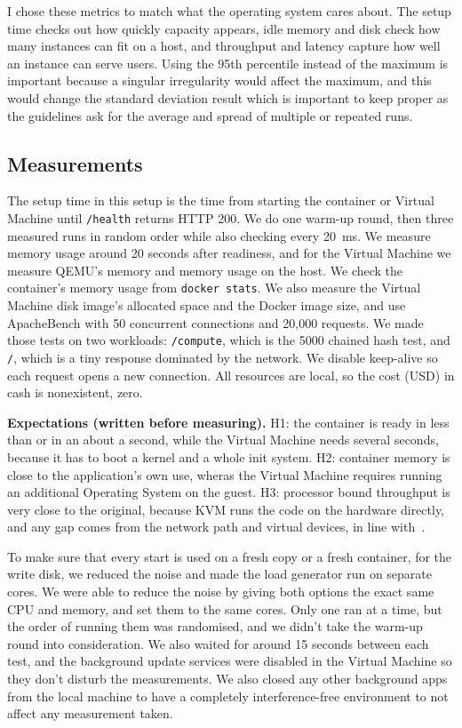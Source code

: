\documentclass[conference,a4paper]{IEEEtran}
\begin{document}
I chose these metrics to match what the operating system cares about. The setup time checks out how quickly capacity appears, idle memory and disk check how many instances can fit on a host, and throughput and latency capture how well an instance can serve users. Using the 95th percentile instead of the maximum is important because a singular irregularity would affect the maximum, and this would change the standard deviation result which is important to keep proper as the guidelines ask for the average and spread of multiple or repeated runs.

\subsection{Measurements}
The setup time in this setup is the time from starting the container or Virtual Machine until \texttt{/health} returns HTTP 200. We do one warm-up round, then three measured runs in random order while also checking every 20~ms. We measure memory usage around 20 seconds after readiness, and for the Virtual Machine we measure QEMU’s memory and memory usage on the host. We check the container’s memory usage from \texttt{docker stats}. We also measure the Virtual Machine disk image’s allocated space and the Docker image size, and use ApacheBench with 50 concurrent connections and 20,000 requests. We made those tests on two workloads: \texttt{/compute}, which is the 5000 chained hash test, and \texttt{/}, which is a tiny response dominated by the network. We disable keep-alive so each request opens a new connection. All resources are local, so the cost (USD) in cash is nonexistent, zero.

\textbf{Expectations (written before measuring).} H1: the container is ready in less than or in an about a second, while the Virtual Machine needs several seconds, because it has to boot a kernel and a whole init system. H2: container memory is close to the application's own use, wheras the Virtual Machine requires running an additional Operating System on the guest. H3: processor bound throughput is very close to the original, because KVM runs the code on the hardware directly, and any gap comes from the network path and virtual devices, in line with~\cite{b3}.

To make sure that every start is used on a fresh copy or a fresh container, for the write disk, we reduced the noise and made the load generator run on separate cores. We were able to reduce the noise by giving both options the exact same CPU and memory, and set them to the same cores. Only one ran at a time, but the order of running them was randomised, and we didn’t take the warm-up round into consideration. We also waited for around 15 seconds between each test, and the background update services were disabled in the Virtual Machine so they don’t disturb the measurements. We also closed any other background apps from the local machine to have a completely interference-free environment to not affect any measurement taken.
\end{document}
